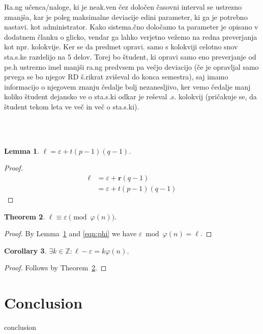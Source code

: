 \documentclass{IEEEtran}
\newcommand{\B}[1]{\ensuremath{\boldsymbol{#1}}}
\newcommand{\Z}{\ensuremath{\mathbb Z}}
\newtheorem{theorem}{Theorem}[section]
\newtheorem{corollary}[theorem]{Corollary}
\newtheorem{lemma}[theorem]{Lemma}
\begin{document}
Ra.ng učenca/naloge, ki je neak.ven čez določen časovni interval se ustrezno zmanjša, kar je poleg maksimalne deviacije edini parameter, ki ga je potrebno nastavi. kot administrator. Kako sistema.čno določamo ta parameter je opisano v dodatnem članku o glicko, vendar ga lahko verjetno vežemo na redna preverjanja kot npr. kolokvije. Ker se da predmet opravi. samo s kolokviji celotno snov sta.s.ke razdelijo na 5 delov. Torej bo študent, ki opravi samo eno preverjanje od pe.h ustrezno imel manjši ra.ng predvsem pa večjo deviacijo (če je opravljal samo prvega se bo njegov RD š.rikrat zviševal do konca semestra), saj imamo informacijo o njegovem znanju čedalje bolj nezanesljivo, ker vemo čedalje manj koliko študent dejansko ve o sta.s.ki odkar je reševal .s. kolokvij (pričakuje se, da študent tekom leta ve več in več o sta.s.ki).


\hfill
\\
\\
\begin{lemma} \label{lem:eps}
$\ell = \varepsilon + t(p-1)(q-1)$.
\end{lemma}

\begin{proof}
\begin{align*}
\ell &= \varepsilon + \B{r}(q-1) \\
&= \varepsilon + t(p-1)(q-1)
\end{align*}
\end{proof}

\begin{theorem} \label{thm:equiv}
$\ell \equiv \varepsilon \pmod{\varphi(n)}$.
\end{theorem}

\begin{proof}
By Lemma~\ref{lem:eps} and \eqref{eqn:phi} we have $\varepsilon \bmod{\varphi(n)} = \ell$.
\end{proof}

\begin{corollary} \label{cor:mult}
$\exists k \in \Z: \ell - \varepsilon = k \varphi(n)$.
\end{corollary}

\begin{proof}
Follows by Theorem~\ref{thm:equiv}.
\end{proof}

\section{Conclusion}
\label{sec:cnc}
conclusion



\end{document}
